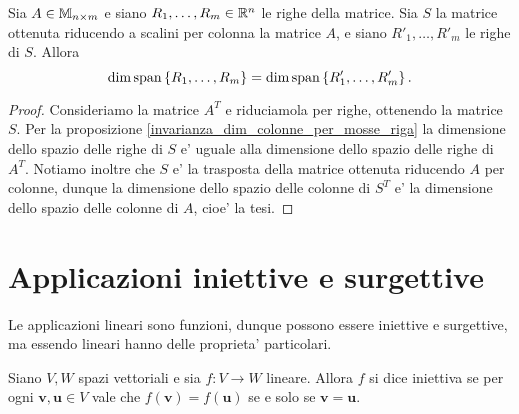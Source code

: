 \begin{corollary}\label{invarianza_dim_righe_per_mosse_colonna}
    Sia $A \in \mathbb{M}_{n\times m}$ e siano $R_1, \dots, R_m \in \mathbb{R}^n$ le righe della matrice. Sia $S$ la matrice ottenuta riducendo a scalini per colonna la matrice $A$, e siano $R'_1, \dots, R'_m$ le righe di $S$. Allora \begin{equation}
        \dim \operatorname{span}\left\{R_1, \dots, R_m\right\} = \dim \operatorname{span}\left\{R'_1, \dots, R'_m\right\}.
    \end{equation}
\end{corollary}
\begin{proof}
    Consideriamo la matrice $A^T$ e riduciamola per righe, ottenendo la matrice $S$. Per la proposizione \ref{invarianza_dim_colonne_per_mosse_riga} la dimensione dello spazio delle righe di $S$ e' uguale alla dimensione dello spazio delle righe di $A^T$. Notiamo inoltre che $S$ e' la trasposta della matrice ottenuta riducendo $A$ per colonne, dunque la dimensione dello spazio delle colonne di $S^T$ e' la dimensione dello spazio delle colonne di $A$, cioe' la tesi.
\end{proof}

\section{Applicazioni iniettive e surgettive}

Le applicazioni lineari sono funzioni, dunque possono essere iniettive e surgettive, ma essendo lineari hanno delle proprieta' particolari.

\begin{definition}
    Siano $V, W$ spazi vettoriali e sia $f : V \to W$ lineare. Allora $f$ si dice iniettiva se per ogni $\bm{v}, \bm{u} \in V$ vale che $f(\bm{v}) = f(\bm{u})$ se e solo se $\bm{v} = \bm{u}$.
\end{definition}

